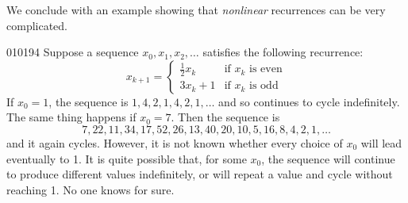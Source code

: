 We conclude with an example showing that \textit{nonlinear} recurrences can be very complicated.


\begin{example}{}{010194}
Suppose a sequence $x_{0}, x_{1}, x_{2}, \dots$  satisfies the following recurrence:
\begin{equation*}
x_{k+1} = \left\lbrace \begin{array}{ll}
\frac{1}{2} x_k & \mbox{if } x_k \mbox{ is even} \\
3x_k + 1 & \mbox{if } x_k \mbox{ is odd}
\end{array} \right.
\end{equation*}
If $x_{0} = 1$, the sequence is $1, 4, 2, 1, 4, 2, 1, \dots$  and so continues to cycle indefinitely. The same thing happens if $x_{0} = 7$. Then the sequence is
\begin{equation*}
7, 22, 11, 34, 17, 52, 26, 13, 40, 20, 10, 5, 16, 8, 4, 2, 1, \ldots
\end{equation*}
and it again cycles. However, it is not known whether every choice of $x_{0}$ will lead eventually to 1. It is quite possible that, for some $x_{0}$,
 the sequence will continue to produce different values indefinitely, or
 will repeat a value and cycle without reaching 1. No one knows for 
sure.
\end{example}
